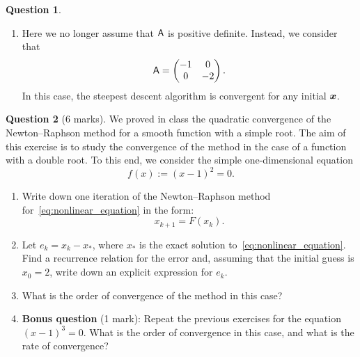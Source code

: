 \documentclass[11pt]{article}
\theoremstyle{definition}
\newtheorem{question}{Question}
\begin{document}
\begin{question}
\begin{itemize}
\begin{enumerate}
            \item
                Here we no longer assume that $\mathsf A$ is positive definite.
                Instead, we consider that
                \[
                    \mathsf A =
                    \begin{pmatrix}
                        -1 & 0 \\ 0 & -2
                    \end{pmatrix}.
                \]
                In this case, the steepest descent algorithm is convergent for any initial $\mathbf{\boldsymbol{x}}$.
        \end{enumerate}
    \end{itemize}
\end{question}

\newpage
\begin{question}
    [6 marks]
    We proved in class the quadratic convergence of the Newton--Raphson method for a smooth function with a simple root.
    The aim of this exercise is to study the convergence of the method in the case of a function with a double root.
    To this end, we consider the simple one-dimensional equation
    \begin{equation}
        \label{eq:nonlinear_equation}
        f(x) := (x-1)^2 = 0.
    \end{equation}
    \begin{enumerate}
        \item
            Write down one iteration of the Newton--Raphson method for~\eqref{eq:nonlinear_equation} in the form:
            \[
                x_{k+1} = F(x_k).
            \]

        \item
            Let $e_k = x_k - x_*$, where $x_*$ is the exact solution to~\eqref{eq:nonlinear_equation}.
            Find a recurrence relation for the error and,
            assuming that the initial guess is $x_0 = 2$,
            write down an explicit expression for $e_k$.

        \item
            What is the order of convergence of the method in this case?

        \item
            \textbf{Bonus question} (1 mark):
            Repeat the previous exercises for the equation $(x-1)^3 = 0$.
            What is the order of convergence in this case,
            and what is the rate of convergence?
    \end{enumerate}
\end{question}
\end{document}
